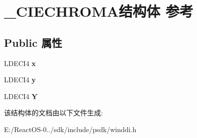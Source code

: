\hypertarget{struct___c_i_e_c_h_r_o_m_a}{}\section{\+\_\+\+C\+I\+E\+C\+H\+R\+O\+M\+A结构体 参考}
\label{struct___c_i_e_c_h_r_o_m_a}
\subsection*{Public 属性}
\begin{DoxyCompactItemize}
\item 
\mbox{\label{struct___c_i_e_c_h_r_o_m_a_a544c6076aaa83a72a6ae9de6c6f4985d}} 
L\+D\+E\+C\+I4 {\bfseries x}
\item 
\mbox{\label{struct___c_i_e_c_h_r_o_m_a_aea90093b8d283749b83dbd96a6645bef}} 
L\+D\+E\+C\+I4 {\bfseries y}
\item 
\mbox{\label{struct___c_i_e_c_h_r_o_m_a_a7b9898d6660f9217863bebafc6fa0a96}} 
L\+D\+E\+C\+I4 {\bfseries Y}
\end{DoxyCompactItemize}


该结构体的文档由以下文件生成\+:\begin{DoxyCompactItemize}
\item 
E\+:/\+React\+O\+S-\/0../sdk/include/psdk/winddi.\+h\end{DoxyCompactItemize}
